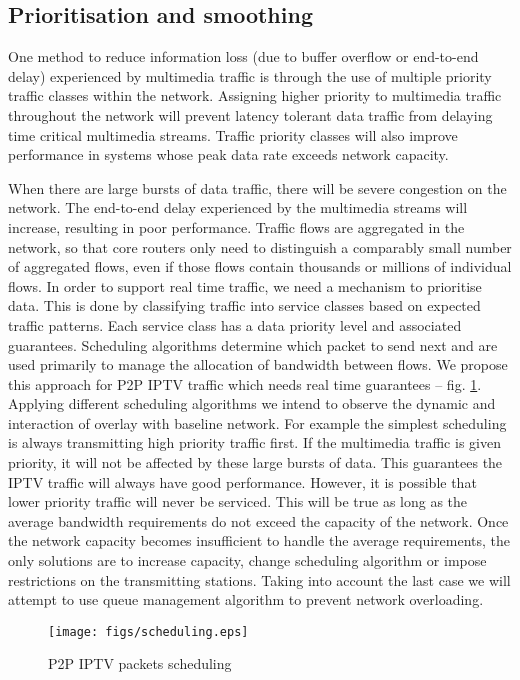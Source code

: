 \documentclass[10pt, conference, compsocconf]{IEEEtran}
\begin{document}
\subsection{Prioritisation and smoothing}
One method to reduce information loss (due to buffer overflow or end-to-end delay) experienced by multimedia traffic is through the use of multiple priority traffic classes within the network. Assigning higher priority to multimedia traffic throughout the network will prevent latency tolerant data traffic from delaying time critical multimedia streams. Traffic priority classes will also improve performance in systems whose peak data rate exceeds network capacity. 

When there are large bursts of data traffic, there will be severe congestion on the network. The end-to-end delay experienced by the multimedia streams will increase, resulting in poor performance. Traffic flows are aggregated in the network, so that core routers only need to distinguish a comparably small number of aggregated flows, even if those flows contain thousands or millions of individual flows. In order to support real time traffic, we need a mechanism to prioritise data. This is done by classifying traffic into service classes based on expected traffic patterns. Each service class has a data priority level and associated guarantees.  Scheduling algorithms determine which packet to send next and are used primarily to manage the allocation of bandwidth between flows. We propose this approach for P2P IPTV traffic which needs real time guarantees -- fig. \ref{fig:scheduling}. Applying different scheduling algorithms we intend to observe the dynamic and interaction of overlay with baseline network. For example the simplest scheduling is always transmitting high priority traffic first. If the multimedia traffic is given priority, it will not be affected by these large bursts of data.  This guarantees the IPTV traffic will always have good performance. However, it is possible that lower priority traffic will never be serviced. This will be true as long as the average bandwidth requirements do not exceed the capacity of the network. Once the network capacity becomes insufficient to handle the average requirements, the only solutions are to increase capacity, change scheduling algorithm or impose restrictions on the transmitting stations. Taking into account the last case we will attempt to use queue management algorithm to prevent network overloading.

\begin{figure}[!t]
\centering
\texttt{[image: figs/scheduling.eps]}
\caption{P2P IPTV packets scheduling}
\label{fig:scheduling}
\end{figure}
\end{document}
